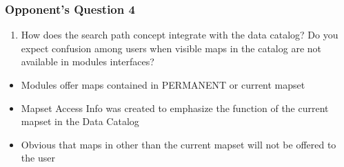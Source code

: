 \documentclass[aspectratio=169]{beamer}
\begin{document}
\begin{frame}
\frametitle{Opponent's Question 4}
\begin{enumerate}\addtocounter{enumi}{3}
\item{How does the search path concept integrate with the data catalog? Do you expect confusion among users when visible maps in the catalog are not available in modules interfaces?}
\end{enumerate}
\begin{itemize}
\vspace{0.3cm}
\item{Modules offer maps contained in PERMANENT or current mapset}
\item{Mapset Access Info was created to emphasize the function of the current mapset in the Data Catalog}
\item{Obvious that maps in other than the current mapset will not be offered to the user} 
\end{itemize}
\end{frame}
\end{document}

